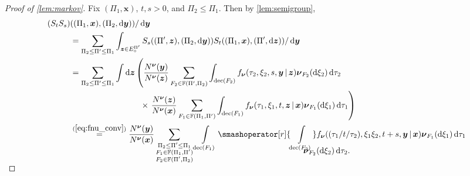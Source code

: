 \documentclass[reqno,draft]{amsart}
\numberwithin{equation}{section}
\theoremstyle{plain}
\theoremstyle{remark}
\newcommand*\diff{\mathop{}\!\mathrm{d}}
\newcommand{\fpart}{\Pi} %
\DeclareMathOperator{\dcb}{dec}
\newcommand{\semi}{S}
\newcommand{\fnu}{f_{\boldsymbol \nu}}
\begin{document}
\begin{proof}[Proof of \cref{lem:markov}]
    Fix $(\fpart_1,\boldsymbol x)$, $t, s > 0$, and $\fpart_2\le \fpart_1$. Then by \cref{lem:semigroup},
    \begin{align}
        (\semi_t \semi_s)&((\fpart_1,\boldsymbol x),(\fpart_2,\diff \boldsymbol y)) / \diff \boldsymbol y \nonumber\\
        &= \sum_{\fpart_2\le \fpart'\le \fpart_1} \int_{\boldsymbol z \in E^{\fpart'}_\circ } \semi_s((\fpart',\boldsymbol z),(\fpart_2,\diff \boldsymbol y)) \semi_t((\fpart_1,\boldsymbol x),(\fpart',\diff \boldsymbol z)) / \diff \boldsymbol y\nonumber\\
        &= \sum_{\fpart_2\le \fpart'\le \fpart_1} \int \diff \boldsymbol z \left( \frac{N^{\boldsymbol\nu}(\boldsymbol y)}{N^{\boldsymbol\nu}(\boldsymbol z)} \sum_{F_2\in \mathbb{F}(\fpart',\fpart_2)} \int_{\dcb(F_2)} \fnu(\tau_2,\xi_2,s,\boldsymbol y \,\vert\,\boldsymbol z)\boldsymbol \nu_{F_2}(\diff \xi_2) \diff \tau_2 \right. \nonumber\\
        &\hspace{3cm} \times \left. \frac{N^{\boldsymbol\nu}(\boldsymbol z)}{N^{\boldsymbol\nu}(\boldsymbol x)} \sum_{F_1 \in \mathbb{F}(\fpart_1,\fpart')} \int_{\dcb(F_1)} \fnu(\tau_1,\xi_1,t,\boldsymbol z \,\vert\,\boldsymbol x)\boldsymbol \nu_{F_1}(\diff \xi_1) \diff \tau_1 \right)\nonumber \\
        &\stackrel{(\ref{eq:fnu_conv})}{=} \frac{N^{\boldsymbol\nu}(\boldsymbol y)}{N^{\boldsymbol\nu}(\boldsymbol x)} \sum_{\substack{\fpart_2\le \fpart'\le \fpart_1 \\ F_1 \in \mathbb{F}(\fpart_1,\fpart') \\F_2 \in \mathbb{F}(\fpart',\fpart_2)}}
        \int\limits_{\dcb(F_1)} \smashoperator[r]{\int\limits_{\dcb(F_2)}}\fnu((\tau_1 / t / \tau_2),\xi_1 \xi_2,t+s,\boldsymbol y \,\vert\,\boldsymbol x) \boldsymbol \nu_{F_1}(\diff \xi_1) \diff \tau_1\label{eqprf:markov:1}\\[-25pt]
        &\hspace*{10cm} \boldsymbol \nu_{F_2}(\diff \xi_2) \diff \tau_2.\nonumber
    \end{align}
    \vspace{.5cm}


\end{proof}
\end{document}
